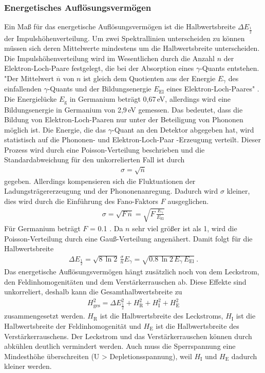 \subsubsection{Energetisches Auflösungsvermögen}
\label{sec:EAuflösung}
Ein Maß für das energetische Auflösungsvermögen ist die Halbwertsbreite $\Delta E_\frac{1}{2}$ der Impulshöhenverteilung. Um zwei Spektrallinien unterscheiden zu können müssen sich deren Mittelwerte mindestens um die Halbwertsbreite unterscheiden. \\
Die Impulshöhenverteilung wird im Wesentlichen durch die Anzahl $n$ der Elektron-Loch-Paare festgelegt, die bei der Absorption eines $\gamma$-Quants entstehen. "Der Mittelwert $\overline{n}$ von $n$ ist gleich dem Quotienten aus der Energie $E_\gamma$ des einfallenden $\gamma$-Quants und der Bildungsenergie $E_\text{El}$ eines Elektron-Loch-Paares" \cite[14]{V18}. Die Energielücke $E_\text{g}$ in Germanium beträgt 0,67\,eV, allerdings wird eine Bildungsenergie in Germanium von 2,9\,eV gemessen. Das bedeutet, dass die Bildung von Elektron-Loch-Paaren nur unter der Beteiligung von Phononen möglich ist. Die Energie, die das $\gamma$-Quant an den Detektor abgegeben hat, wird statistisch auf die Phononen- und Elektron-Loch-Paar -Erzeugung verteilt. Dieser Prozess wird durch eine Poisson-Verteilung beschrieben und die Standardabweichung für den unkorrelierten Fall ist durch
\begin{align}
	\sigma = \sqrt{\overline{n}}
\end{align}
gegeben. Allerdings kompensieren sich die Fluktuationen der Ladungsträgererzeugung und der Phononenanregung. Dadurch wird $\sigma$ kleiner, dies wird durch die Einführung des Fano-Faktors $F$ ausgeglichen.
\begin{align}
	\sigma = \sqrt{F\,\overline{n}} = \sqrt{F\,\frac{E_\gamma}{E_\text{El}}}
\end{align}
Für Germanium beträgt $F$ = 0.1 \cite[15]{V18}. Da $n$ sehr viel größer ist als 1, wird die Poisson-Verteilung durch eine Gauß-Verteilung angenähert. Damit folgt für die Halbwertsbreite
\begin{align}
	\Delta E_\frac{1}{2} = \sqrt{8\,\ln2} \, \frac{\sigma} {\overline{n}} E_\gamma = \sqrt{0.8\,\ln2\,E_\gamma \, E_\text{El}} \ .
\end{align}
Das energetische Auflösungsvermögen hängt zusätzlich noch von dem Leckstrom, den Feldinhomogenitäten und dem Verstärkerrauschen ab. Diese Effekte sind unkorreliert, deshalb kann die Gesamthalbwertsbreite zu
\begin{align}
	H_\text{ges}^2 = \Delta E_\frac{1}{2}^2 + H_\text{R}^2 + H_\text{I}^2 + H_\text{E}^2
\end{align}
zusammengesetzt werden. $H_\text{R}$ ist die Halbwertsbreite des Leckstroms, $H_\text{I}$ ist die Halbwertsbreite der Feldinhomogenität und $H_\text{E}$ ist die Halbwertsbreite des Verstärkerrauschens. Der Leckstrom und das Verstärkerrauschen können durch abkühlen deutlich vermindert werden. Auch muss die Sperrspannung eine Mindesthöhe überschreiten (U > Depletionsspannung), weil $H_\text{I}$ und $H_\text{E}$ dadurch kleiner werden.



